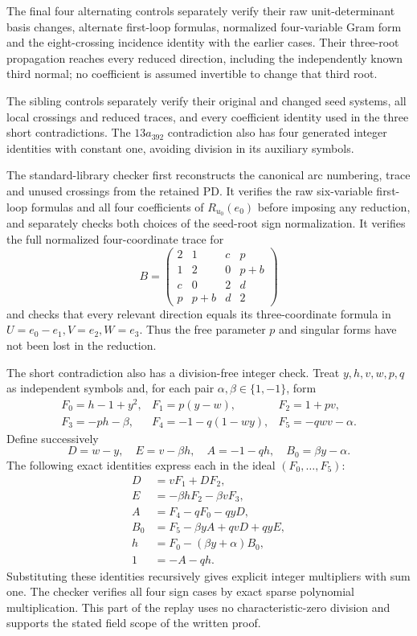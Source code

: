 \documentclass[11pt]{article}
\begin{document}
The final four alternating controls separately verify their raw
unit-determinant basis changes, alternate first-loop formulas,
normalized four-variable Gram form and the eight-crossing incidence
identity with the earlier cases. Their three-root propagation reaches
every reduced direction, including the independently known third
normal; no coefficient is assumed invertible to change that third root.

The sibling controls separately verify their original and changed seed
systems, all local crossings and reduced traces, and every coefficient
identity used in the three short contradictions. The $13a_{392}$
contradiction also has four generated integer identities with constant
one, avoiding division in its auxiliary symbols.

The standard-library checker first reconstructs the canonical arc
numbering, trace and unused crossings from the retained PD. It verifies
the raw six-variable first-loop formulas and all four coefficients
of $R_{u_0}(e_0)$ before imposing any reduction, and separately
checks both choices of the seed-root sign normalization.
It verifies the full normalized four-coordinate trace for
\[
 B=\begin{pmatrix}
 2&1&c&p\\1&2&0&p+b\\c&0&2&d\\p&p+b&d&2
 \end{pmatrix}
\]
and checks that every relevant direction equals its three-coordinate
formula in $U=e_0-e_1,V=e_2,W=e_3$. Thus the free parameter $p$
and singular forms have not been lost in the reduction.

The short contradiction also has a division-free integer check.
Treat $y,h,v,w,p,q$ as independent symbols and, for each pair
$\alpha,\beta\in\{1,-1\}$, form
\[
\begin{array}{lll}
 F_0=h-1+y^2,&F_1=p(y-w),&F_2=1+pv,\\
 F_3=-ph-\beta,&F_4=-1-q(1-wy),&F_5=-qwv-\alpha.
\end{array}
\]
Define successively
\[
 D=w-y,\quad E=v-\beta h,\quad A=-1-qh,\quad B_0=\beta y-\alpha.
\]
The following exact identities express each in the ideal $(F_0,\ldots,F_5)$:
\begin{align*}
 D&=vF_1+DF_2,\\
 E&=-\beta hF_2-\beta vF_3,\\
 A&=F_4-qF_0-qyD,\\
 B_0&=F_5-\beta yA+qvD+qyE,\\
 h&=F_0-(\beta y+\alpha)B_0,\\
 1&=-A-qh.
\end{align*}
Substituting these identities recursively gives explicit integer
multipliers with sum one. The checker verifies all four sign cases
by exact sparse polynomial multiplication. This part of the replay
uses no characteristic-zero division and supports the stated field
scope of the written proof.
\end{document}
